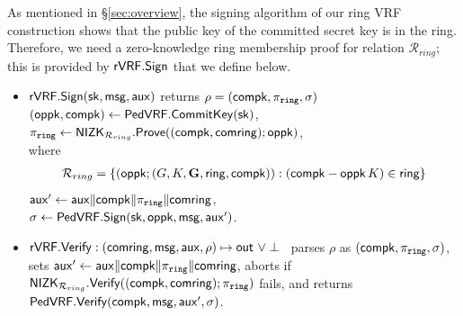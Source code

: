 	As mentioned in \S\ref{sec:overview}, the signing algorithm of our ring VRF construction shows that the public key of the committed secret key is in the ring. Therefore, we need a zero-knowledge ring membership proof for relation $ \mathcal{R}_{ring} $; this is provided by $ \rVRF.\Sign $ that we define below.
%	
	
	\def\tmpaux{\aux \doubleplus \compk \doubleplus \piring \doubleplus \comring}
	\def\tmpeprintaux{\eprint{\aux'}{\tmpaux}}
	\def\tmpindent{\hspace*{5pt}}
	\begin{itemize}
		\item $\rVRF.\rSign\eprint{ : }{}(\sk,\msg,\aux)\eprint{ \mapsto \rho}{}$ returns $\rho = (\compk,\piring,\sigma)$  
		\tmpindent $(\openpk,\compk) \leftarrow \PedVRF.\CommitKey(\sk)$,  \\
		\tmpindent $\piring \leftarrow \NIZK_{\mathcal{R}_{ring}}.\Prove((\compk,\comring); \openpk)$, \\
		where 
		\begin{align}
				\mathcal{R}_{ring} = \{(\openpk;(\genG,\genB,\grE,\ring, \compk)): (\compk-\openpk \, \genB)  \in \ring\} \label{rel:snark} \nonumber
			\end{align}
		\tmpindent $\aux' \leftarrow \tmpaux$,  \\
		\tmpindent $\sigma \leftarrow \PedVRF.\Sign(\sk,\openpk,\msg, \aux')$.
		\item $\rVRF.\rVerify : (\comring,\msg,\aux,\rho) \mapsto \Out \,\, \lor \perp$ \,
		parses $\rho$ as $(\compk,\piring,\sigma)$, sets $\aux' \leftarrow \tmpaux$,
		aborts if $\NIZK_{\mathcal{R}_{ring}}.\Verify((\compk,\comring); \piring)$ fails,
		and returns $\PedVRF.\Verify(\compk,\msg, \aux', \sigma)$.
	\end{itemize}
	





